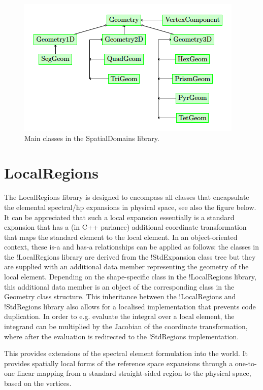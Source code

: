 \begin{figure}
\centering
\includegraphics{img/SpatialDomains.png}
\caption{Main classes in the SpatialDomains library.}
\label{f:library:spatialdomains}
\end{figure}


\section{LocalRegions}
The LocalRegions library is designed to encompass all classes that encapsulate
the elemental spectral/hp expansions in physical space, see also the figure
below. It can be appreciated that such a local expansion essentially is a
standard expansion that has a (in C++ parlance) additional coordinate
transformation that maps the standard element to the local element. In an
object-oriented context, these is-a and has-a relationships can be applied as
follows: the classes in the !LocalRegions library are derived from the
{!StdExpansion} class tree but they are supplied with an additional data member
representing the geometry of the local element. Depending on the shape-specific
class in the !LocalRegions library, this additional data member is an object of
the corresponding class in the Geometry class structure. This inheritance
between the !LocalRegions and !StdRegions library also allows for a localised
implementation that prevents code duplication. In order to e.g. evaluate the
integral over a local element, the integrand can be multiplied by the Jacobian
of the coordinate transformation, where after the evaluation is redirected to
the !StdRegions implementation.

This provides extensions of the spectral element formulation into the world. It
provides spatially local forms of the reference space expansions through a
one-to-one linear mapping from a standard straight-sided region to the physical
space, based on the vertices.

